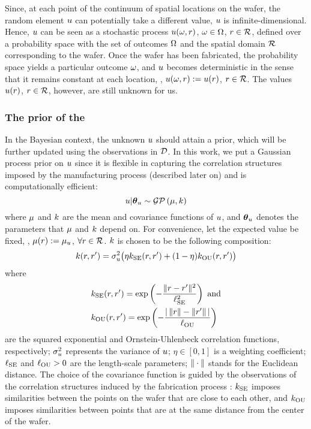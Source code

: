 Since, at each point of the continuum of spatial locations on the wafer, the random element $u$ can potentially take a different value, $u$ is infinite-dimensional.
Hence, $u$ can be seen as a stochastic process $u(\omega, r)$, $\omega \in \Omega$, $r \in \mathcal{R}$, defined over a probability space with the set of outcomes $\Omega$ \cite{durrett2010} and the spatial domain $\mathcal{R}$ corresponding to the wafer.
Once the wafer has been fabricated, the probability space yields a particular outcome $\omega$, and $u$ becomes deterministic in the sense that it remains constant at each location, \ie, $u(\omega, r) := u(r)$, $r \in \mathcal{R}$.
The values $u(r)$, $r \in \mathcal{R}$, however, are still unknown for us.

\subsubsection{The prior of the \qoi}
In the Bayesian context, the unknown $u$ should attain a prior, which will be further updated using the observations in $\mathcal{D}$. In this work, we put a Gaussian process prior \cite{rasmussen2006} on $u$ since it is flexible in capturing the correlation structures imposed by the manufacturing process (described later on) and is computationally efficient:
\[
  \u | \vparam_\u \sim \gaussianp{\fMean}{\fCov}
\]
where $\fMean$ and $\fCov$ are the mean and covariance functions of $u$, and ${\boldsymbol\theta}_u$ denotes the parameters that $\fMean$ and $\fCov$ depend on. For convenience, let the expected value be fixed, \ie, $\fMean{\r} := \mu_\u$, $\forall r \in \mathcal{R}$.
$\fCov$ is chosen to be the following composition:
\begin{equation} \elabel{covariance-function}
  \fCov{\r, \r'} = \sigma_\u^2 \big( \eta \fCov_\SE(\r, \r') + (1 - \eta) \fCov_\OU(\r, \r') \big)
\end{equation}
where
\begin{align*}
  & \fCov_\SE(\r, \r') = \exp\left(-\frac{\norm{\r - \r'}^2}{\ell_\SE^2}\right) \text{ and} \\
  & \fCov_\OU(\r, \r') = \exp\left(- \frac{\abs{\,\norm{\r} - \norm{\r'}\,}}{\ell_\OU} \right)
\end{align*}
are the squared exponential and Ornstein-Uhlenbeck correlation functions, respectively; $\sigma_u^2$ represents the variance of $u$; $\eta \in [0, 1]$ is a weighting coefficient; $\ell_{\text{SE}}$ and $\ell_{\text{OU}} > 0$ are the length-scale parameters; $\| \cdot \|$ stands for the Euclidean distance.
The choice of the covariance function is guided by the observations of the correlation structures induced by the fabrication process \cite{chandrakasan2001, cheng2011}: $\fCov_\SE$ imposes similarities between the points on the wafer that are close to each other, and $\fCov_\OU$ imposes similarities between points that are at the same distance from the center of the wafer.
